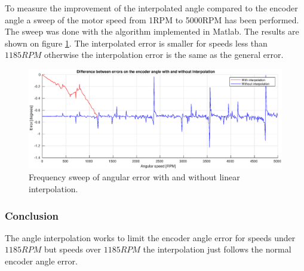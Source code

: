 To measure the improvement of the interpolated angle compared to the encoder angle a sweep of the motor speed from 1RPM to 5000RPM has been performed. The sweep was done with the algorithm implemented in Matlab. The results are shown on figure \ref{fig:interpolation_error}. The interpolated error is smaller for speeds less than $1185RPM$ otherwise the interpolation error is the same as the general error.


\begin{figure}[H]
	\centering
	\includegraphics[width=1\textwidth]{pictures/software/interpolation_error.eps}
	\caption{Frequency sweep of angular error with and without linear interpolation.}
	\label{fig:interpolation_error}
\end{figure}


\subsubsection*{Conclusion}
The angle interpolation works to limit the encoder angle error for speeds under $1185RPM$ but speeds over $1185RPM$ the interpolation just follows the normal encoder angle error.